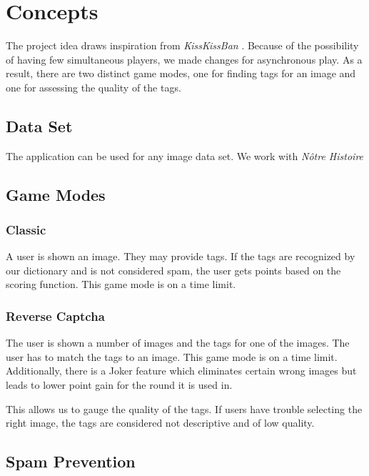 \section{Concepts}
\label{gXLII:sec:concepts} %


The project idea draws inspiration from \textit{KissKissBan} \cite{10.1145/1600150.1600153}. 
Because of the possibility of having few simultaneous players, we made changes for asynchronous play. As a result, there are two distinct game modes, one for finding tags for an image and one for assessing the quality of the tags.



\subsection{Data Set}
The application can be used for any image data set. We work with \textit{Nôtre Histoire}

\subsection{Game Modes}

\subsubsection{Classic}

A user is shown an image. They may provide tags. If the tags are recognized by our dictionary and is not considered spam, the user gets points based on the scoring function.
This game mode is on a time limit.

\subsubsection{Reverse Captcha}

The user is shown a number of images and the tags for one of the images. The user has to match the tags to an image.  
This game mode is on a time limit. Additionally, there is a Joker feature which eliminates certain wrong images but leads to lower point gain for the round it is used in.

This allows us to gauge the quality of the tags. If users have trouble selecting the right image, the tags are considered not descriptive and of low quality.


\subsection{Spam Prevention}

